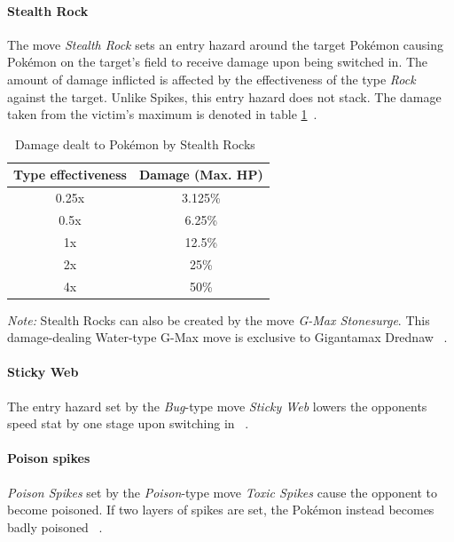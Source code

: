 \paragraph{Stealth Rock}
\label{sec:stealthrock}
The move \textit{Stealth Rock} sets an entry hazard around the target Pokémon
causing Pokémon on the target's field to receive damage upon being switched in.
The amount of damage inflicted is affected by the effectiveness of the type
\textit{Rock} against the target. Unlike Spikes, this entry hazard does not stack.
The damage taken from the victim's maximum is denoted in table 
\ref{tab:stealth-rock-damage}~\autocite{Bulbapedia:StealthRock}.
\begin{table}[h]
	\label{tab:stealth-rock-damage}
	\centering
	\begin{tabular}{|c|c|}
		\hline
		\textbf{Type effectiveness} & \textbf{Damage (Max. \ac{HP}}) \\
		\hline 
		0.25x & 3.125\% \\ 
		\hline 
		0.5x &  6.25\% \\ 
		\hline 
		1x & 12.5\% \\
		\hline
		2x & 25\% \\
		\hline
		4x & 50\% \\
		\hline
	\end{tabular} 
	\caption{Damage dealt to Pokémon by Stealth Rocks~\autocite{Bulbapedia:StealthRock}}
\end{table}
\textit{Note:} Stealth Rocks can also be created by the move \textit{G-Max Stonesurge}.
This damage-dealing Water-type G-Max move is exclusive to Gigantamax Drednaw
~\autocite{Bulbapedia:GMaxStonesurge}. \\

\paragraph{Sticky Web}
The entry hazard set by the \textit{Bug}-type move \textit{Sticky Web} lowers the
opponents speed stat by one stage upon switching in ~\autocite{Bulbapedia:StickyWeb}. \\

\paragraph{Poison spikes}
\label{sec:poison-spikes}
\textit{Poison Spikes} set by the \textit{Poison}-type move \textit{Toxic Spikes}
cause the opponent to become poisoned. If two layers of spikes are set, the
Pokémon instead becomes badly poisoned ~\autocite{Bulbapedia:ToxicSpikes}. \\
 \\

